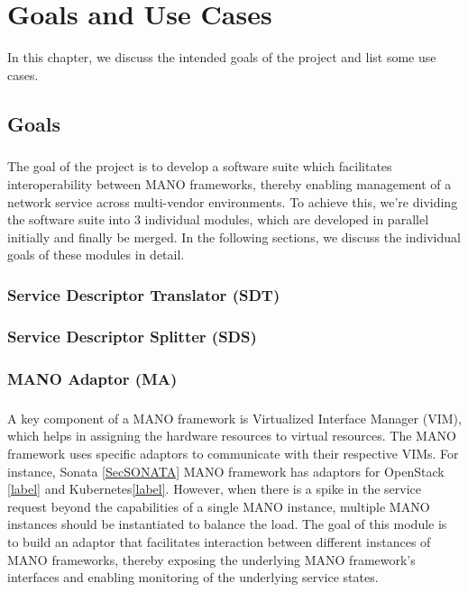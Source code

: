 \chapter{Goals and Use Cases}
\label{ch:Goals and Use Cases}

In this chapter, we discuss the intended goals of the project and list some use cases.

\section{Goals}

\paragraph{}
The goal of the project is to develop a software suite which facilitates interoperability between MANO frameworks, thereby enabling management of a network service across multi-vendor environments. To achieve this, we're dividing the software suite into 3 individual modules, which are developed in parallel initially and finally be merged. In the following sections, we discuss the individual goals of these modules in detail.

\subsection{Service Descriptor Translator (SDT)}
\paragraph{}

\subsection{Service Descriptor Splitter (SDS)}
\paragraph{}

\subsection{MANO Adaptor (MA)}
\paragraph{}

A key component of a MANO framework is Virtualized Interface Manager (VIM),  which helps in assigning the hardware resources to virtual resources. The MANO framework uses specific adaptors to communicate with their respective VIMs. For instance, Sonata \ref{SecSONATA} MANO framework has adaptors for OpenStack \ref{label} and Kubernetes\ref{label}. However, when there is a spike in the service request beyond the capabilities of a single MANO instance, multiple MANO instances should be instantiated to balance the load. The goal of this module is to build an adaptor that facilitates interaction between different instances of MANO frameworks, thereby exposing the underlying MANO framework's interfaces and enabling monitoring of the underlying service states.

